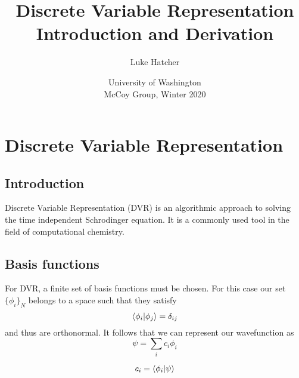 \documentclass[12pt]{article}
\begin{document}
\title{Discrete Variable Representation Introduction and Derivation}
\author{Luke Hatcher}
\date{University of Washington \\ McCoy Group, Winter 2020}
\maketitle


\section{Discrete Variable Representation}
\subsection{Introduction}
Discrete Variable Representation (DVR) is an algorithmic approach to solving the time independent Schrodinger equation. It is a commonly used tool in the field of computational chemistry. 
\subsection{Basis functions}
For DVR, a finite set of basis functions must be chosen. 
For this case our set $\{\phi_i\}_N$ belongs to a space such that they satisfy
\begin{equation}
\braket{\phi_i|\phi_j} = \delta_{ij}
\end{equation}
and thus are orthonormal.  
It follows that we can represent our wavefunction as
\begin{equation}
\psi=\sum_i{c_i}\phi_i
\end{equation}

\begin{equation}
c_i = \braket{\phi_i|\psi}
\end{equation}
\end{document}
